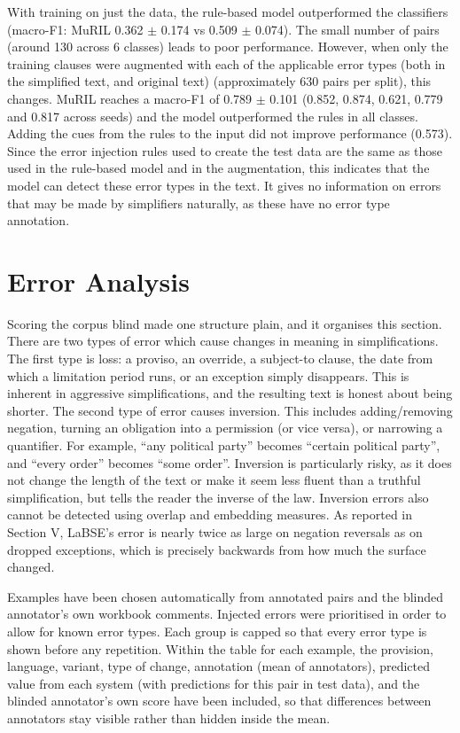 \documentclass[conference]{IEEEtran}
\begin{document}
With training on just the data, the rule-based model outperformed the classifiers (macro-F1: MuRIL 0.362 \ensuremath{\pm} 0.174 vs 0.509 \ensuremath{\pm} 0.074). The small number of pairs (around 130 across 6 classes) leads to poor performance. However, when only the training clauses were augmented with each of the applicable error types (both in the simplified text, and original text) (approximately 630 pairs per split), this changes. MuRIL reaches a macro-F1 of 0.789 \ensuremath{\pm} 0.101 (0.852, 0.874, 0.621, 0.779 and 0.817 across seeds) and the model outperformed the rules in all classes. Adding the cues from the rules to the input did not improve performance (0.573). Since the error injection rules used to create the test data are the same as those used in the rule-based model and in the augmentation, this indicates that the model can detect these error types in the text. It gives no information on errors that may be made by simplifiers naturally, as these have no error type annotation.

\section{Error Analysis}

Scoring the corpus blind made one structure plain, and it organises this section. There are two types of error which cause changes in meaning in simplifications. The first type is loss: a proviso, an override, a subject-to clause, the date from which a limitation period runs, or an exception simply disappears. This is inherent in aggressive simplifications, and the resulting text is honest about being shorter. The second type of error causes inversion. This includes adding/removing negation, turning an obligation into a permission (or vice versa), or narrowing a quantifier. For example, “any political party” becomes “certain political party”, and “every order” becomes “some order”. Inversion is particularly risky, as it does not change the length of the text or make it seem less fluent than a truthful simplification, but tells the reader the inverse of the law. Inversion errors also cannot be detected using overlap and embedding measures. As reported in Section V, LaBSE's error is nearly twice as large on negation reversals as on dropped exceptions, which is precisely backwards from how much the surface changed.

Examples have been chosen automatically from annotated pairs and the blinded annotator's own workbook comments. Injected errors were prioritised in order to allow for known error types. Each group is capped so that every error type is shown before any repetition. Within the table for each example, the provision, language, variant, type of change, annotation (mean of annotators), predicted value from each system (with predictions for this pair in test data), and the blinded annotator's own score have been included, so that differences between annotators stay visible rather than hidden inside the mean.
\end{document}
